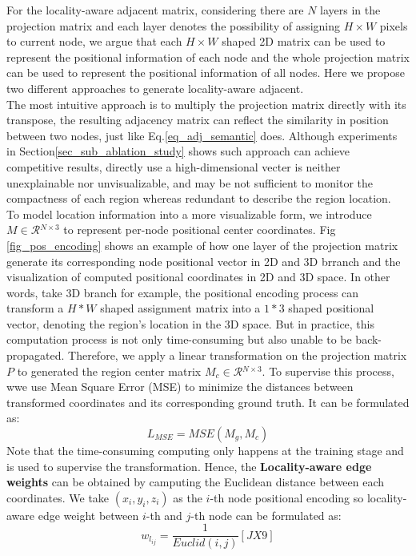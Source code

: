 ﻿\documentclass[journal]{IEEEtran}
\begin{document}
    For the locality-aware adjacent matrix, considering there are $N$ layers in the projection matrix and each layer denotes the possibility of assigning $H \times W$ pixels to current node, we argue that each $H \times W$ shaped 2D matrix can be used to represent the positional information of each node and the whole projection matrix can be used to represent the positional information of all nodes. Here we propose two different approaches to generate locality-aware adjacent. \\
    
    The most intuitive approach is to multiply the projection matrix directly with its transpose, the resulting adjacency matrix can reflect the similarity in position between two nodes, just like Eq.\ref{eq_adj_semantic} does. Although experiments in Section\ref{sec_sub_ablation_study} shows such approach can achieve competitive results, directly use a high-dimensional vecter is neither unexplainable nor unvisualizable, and may be not sufficient to monitor the compactness of each region whereas redundant to describe the region location. \\
    
    To model location information into a more visualizable form, we introduce $M \in \mathcal{R}{^{N\times 3}}$ to represent per-node positional center coordinates. Fig \ref{fig_pos_encoding} shows an example of how one layer of the projection matrix generate its corresponding node positional vector in 2D and 3D brranch and the visualization of computed positional coordinates in 2D and 3D space. In other words, take 3D branch for example, the positional encoding process can transform a $H*W$ shaped assignment matrix into a $1*3$ shaped positional vector, denoting the region's location in the 3D space. But in practice, this computation process is not only time-consuming but also unable to be back-propagated. Therefore, we apply a linear transformation on the projection matrix $P$ to generated the region center matrix ${M}_{c} \in \mathcal{R}{^{N\times 3}}$. To supervise this process, wwe use Mean Square Error (MSE) to minimize the distances between transformed coordinates and its corresponding ground truth. It can be formulated as:
    \begin{equation}\label{loss_mse}
    L_{MSE} = MSE(M_g, M_c)
    \end{equation} 
    Note that the time-consuming computing only happens at the training stage and is used to supervise the transformation. Hence, the \textbf{Locality-aware edge weights} can be obtained by camputing the Euclidean distance between each coordinates. We take $(x_i, y_i, z_i)$ as the $i$-th node positional encoding so locality-aware edge weight between $i$-th and $j$-th node can be formulated as:
    \begin{equation}
        w_{l_{ij}} = \frac{1}{Euclid(i, j)}[JX9]
    \end{equation} 
\end{document}
